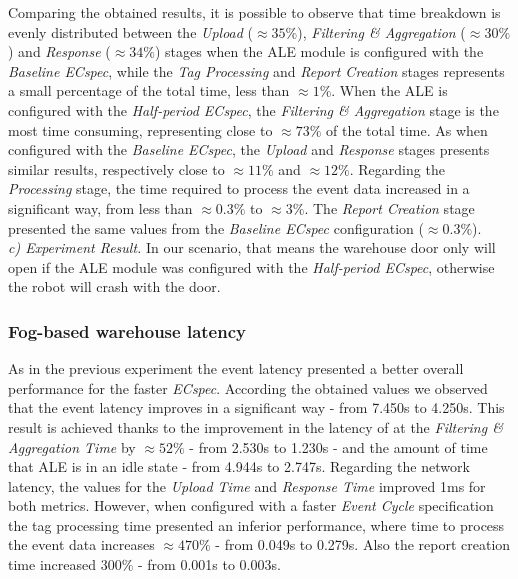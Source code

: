 Comparing the obtained results, it is possible to observe that time breakdown is evenly distributed
between the \textit{Upload} ($\approx35\%$), \textit{Filtering \& Aggregation} ($\approx30\%$) and
\textit{Response} ($\approx34\%$) stages when the \gls{ALE} module is configured with the \textit{Baseline ECspec},
while the \textit{Tag Processing} and \textit{Report Creation} stages represents a small percentage of the
total time, less than $\approx1\%$. When the \gls{ALE} is configured with the \textit{Half-period ECspec},
the \textit{Filtering \& Aggregation} stage is the most time consuming, representing close to $\approx 73\%$
of the total time. As when configured with the \textit{Baseline ECspec}, the \textit{Upload} and
\textit{Response} stages presents similar results, respectively close to $\approx11\%$ and $\approx12\%$.
Regarding the \textit{Processing} stage, the time required to process the event data increased in a significant
way, from less than $\approx0.3\%$ to $\approx3\%$. The \textit{Report Creation} stage presented the same
values from the \textit{Baseline ECspec} configuration ($\approx0.3\%$).\\

\textit{c) Experiment Result.}
In our scenario, that means the warehouse door only will open if the \gls{ALE} module was configured
with the \textit{Half-period ECspec}, otherwise the robot will crash with the door.\\

\subsubsection{Fog-based warehouse latency}
\label{subs:eval_exp_latency_ecspec}
As in the previous experiment the event latency presented a better overall performance for the
faster \textit{ECspec}. According the obtained values we observed that the event latency improves
in a significant way - from 7.450s to 4.250s. This result is achieved thanks to the improvement in
the latency of at the \textit{Filtering \& Aggregation Time} by $\approx52\%$ - from 2.530s to 1.230s -
and the amount of time that \gls{ALE} is in an idle state - from 4.944s to 2.747s. Regarding the
network latency, the values for the \textit{Upload Time} and \textit{Response Time} improved 1ms
for both metrics. However, when configured with a faster \textit{Event Cycle} specification the
tag processing time presented an inferior performance, where time to process the event data increases
$\approx470\%$ - from 0.049s to 0.279s. Also the report creation time increased $300\%$ - from 0.001s to 0.003s.\\

